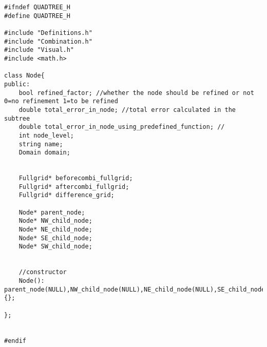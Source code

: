  \lstset{language=C++}
\begin{lstlisting}[caption= Source code for quad trees, label=code:quad]
#ifndef QUADTREE_H
#define QUADTREE_H

#include "Definitions.h"
#include "Combination.h"
#include "Visual.h"
#include <math.h>

class Node{
public:
	bool refined_factor; //whether the node should be refined or not 0=no refinement 1=to be refined
	double total_error_in_node; //total error calculated in the subtree
	double total_error_in_node_using_predefined_function; //
	int node_level;
	string name;
	Domain domain;


	Fullgrid* beforecombi_fullgrid;
	Fullgrid* aftercombi_fullgrid;
	Fullgrid* difference_grid;

	Node* parent_node;
	Node* NW_child_node;
	Node* NE_child_node;
	Node* SE_child_node;
	Node* SW_child_node;


	//constructor
	Node(): parent_node(NULL),NW_child_node(NULL),NE_child_node(NULL),SE_child_node(NULL),SW_child_node(NULL){};

};


#endif
\end{lstlisting}

